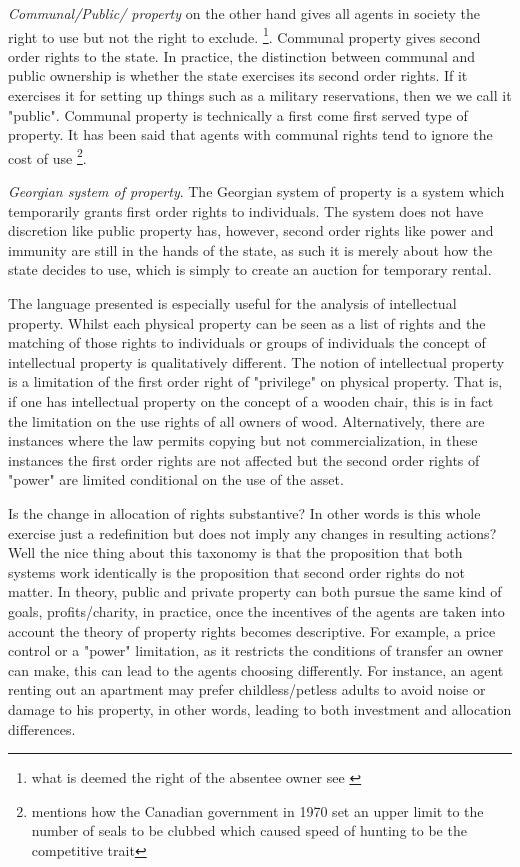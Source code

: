 \documentclass[12pt]{article}
\numberwithin{equation}{section}
\begin{document}
\textit{Communal/Public/ property} on the other hand gives all agents in society the right to use but not the right to exclude. \footnote{what is deemed the right of the absentee owner see \cite{Alchian1973}}. Communal property gives second order rights to the state. In practice, the distinction between communal and public ownership is whether the state exercises its second order rights. If it exercises it for setting up things such as a military reservations, then we we call it "public". Communal property is technically a first come first served type of property. It has been said that agents with communal rights tend to ignore the cost of use \footnote{\cite{Alchian1973} mentions how the Canadian government in 1970 set an upper limit to the number of seals to be clubbed which caused speed of hunting to be the competitive trait}. 

\textit{Georgian system of property}. The Georgian system of property is a system which temporarily grants first order rights to individuals. The system does not have discretion like public property has, however, second order rights like power and immunity are still in the hands of the state, as such it is merely about how the state decides to use, which is simply to create an auction for temporary rental.  

The language presented is especially useful for the analysis of intellectual property. Whilst each physical property can be seen as a list of rights and the matching of those rights to individuals or groups of individuals the concept of intellectual property is qualitatively different. The notion of intellectual property is a limitation of the first order right of "privilege" on physical property. That is, if one has intellectual property on the concept of a wooden chair, this is in fact the limitation on the use rights of all owners of wood. Alternatively, there are instances where the law permits copying but not commercialization, in these instances the first order rights are not affected but the second order rights of "power" are limited conditional on the use of the asset.  

Is the change in allocation of rights substantive? In other words is this whole exercise just a redefinition but does not imply any changes in resulting actions? Well the nice thing about this taxonomy is that the proposition that both systems work identically is the proposition that second order rights do not matter. In theory, public and private property can both pursue the same kind of goals, profits/charity, in practice, once the incentives of the agents are taken into account the theory of property rights becomes descriptive. For example, a price control or a "power" limitation, as it restricts the conditions of transfer an owner can make, this can lead to the agents choosing differently. For instance, an agent renting out an apartment may prefer childless/petless adults to avoid noise or damage to his property, in other words, leading to both investment and allocation differences. 
\end{document}
